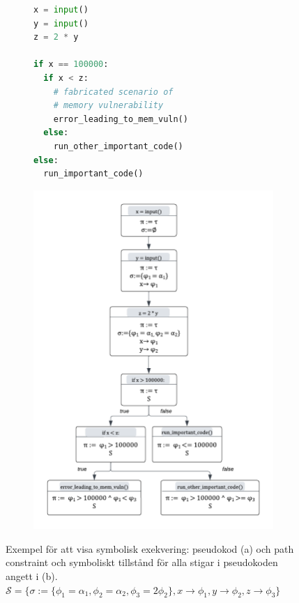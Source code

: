 \begin{figure}[H]
    \begin{subfigure}[b]{0.58\textwidth}
        \begin{lstlisting}[language=Python, frame=single,
        basicstyle=\normalfont\ttfamily]
x = input()
y = input()
z = 2 * y

if x == 100000:
  if x < z:
    # fabricated scenario of
    # memory vulnerability
    error_leading_to_mem_vuln()
  else:
    run_other_important_code()
else:
  run_important_code()
\end{lstlisting}
        \caption{} %
        \label{fig:symbex_example_code}
    \end{subfigure}
    \begin{subfigure}[t]{0.4\textwidth}
        \centering
        \includegraphics[scale=0.31]{figures/final_symbolic_example_graph.png}
        \caption{} %
        \label{fig:symbex_example_graph}
    \end{subfigure}

    \caption{Exempel för att visa symbolisk exekvering: pseudokod (a) och path
        constraint och symboliskt tillstånd för alla stigar i pseudokoden angett
        i (b). $  \mathcal{S} = \{\sigma := \{\phi_1 = \alpha_1, \phi_2 = \alpha_2, \phi_3 =
            2\phi_2\}, x \rightarrow \phi_1, y \rightarrow \phi_2, z \rightarrow
            \phi_3\}$}
\end{figure}

